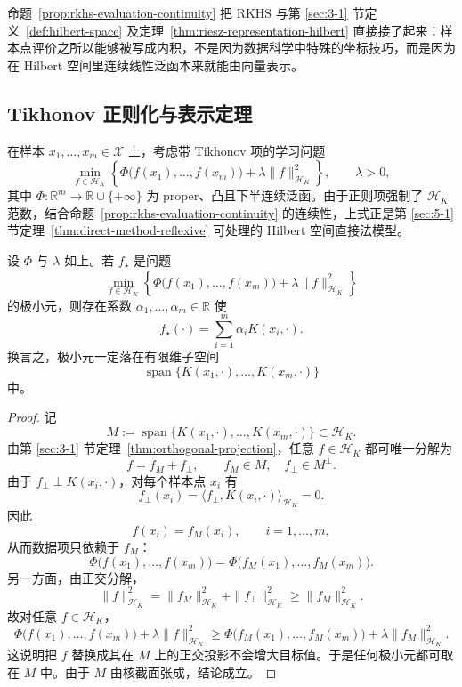 \begin{remark}
命题~\ref{prop:rkhs-evaluation-continuity} 把 RKHS 与第 \ref{sec:3-1} 节定义~\ref{def:hilbert-space} 及定理~\ref{thm:riesz-representation-hilbert} 直接接了起来：样本点评价之所以能够被写成内积，不是因为数据科学中特殊的坐标技巧，而是因为在 Hilbert 空间里连续线性泛函本来就能由向量表示。
\end{remark}

\subsection{Tikhonov 正则化与表示定理}

在样本 $x_1,\dots,x_m\in \mathcal X$ 上，考虑带 Tikhonov 项的学习问题
\[
\min_{f\in \mathcal H_K}
\left\{
\Phi\bigl(f(x_1),\dots,f(x_m)\bigr)+\lambda \|f\|_{\mathcal H_K}^2
\right\},
\qquad \lambda>0,
\]
其中 $\Phi\colon \mathbb R^m\to \mathbb R\cup\{+\infty\}$ 为 proper、凸且下半连续泛函。由于正则项强制了 $\mathcal H_K$ 范数，结合命题~\ref{prop:rkhs-evaluation-continuity} 的连续性，上式正是第 \ref{sec:5-1} 节定理~\ref{thm:direct-method-reflexive} 可处理的 Hilbert 空间直接法模型。

\begin{theorem}\label{thm:representer-theorem}
设 $\Phi$ 与 $\lambda$ 如上。若 $f_\star$ 是问题
\[
\min_{f\in \mathcal H_K}
\left\{
\Phi\bigl(f(x_1),\dots,f(x_m)\bigr)+\lambda \|f\|_{\mathcal H_K}^2
\right\}
\]
的极小元，则存在系数 $\alpha_1,\dots,\alpha_m\in \mathbb R$ 使
\[
f_\star(\cdot)=\sum_{i=1}^m \alpha_i K(x_i,\cdot).
\]
换言之，极小元一定落在有限维子空间
\[
\operatorname{span}\{K(x_1,\cdot),\dots,K(x_m,\cdot)\}
\]
中。
\end{theorem}

\begin{proof}
记
\[
M:=\operatorname{span}\{K(x_1,\cdot),\dots,K(x_m,\cdot)\}\subset \mathcal H_K.
\]
由第 \ref{sec:3-1} 节定理~\ref{thm:orthogonal-projection}，任意 $f\in \mathcal H_K$ 都可唯一分解为
\[
f=f_M+f_\perp,
\qquad
f_M\in M,\quad f_\perp\in M^\perp.
\]
由于 $f_\perp\perp K(x_i,\cdot)$，对每个样本点 $x_i$ 有
\[
f_\perp(x_i)=\langle f_\perp,K(x_i,\cdot)\rangle_{\mathcal H_K}=0.
\]
因此
\[
f(x_i)=f_M(x_i),\qquad i=1,\dots,m,
\]
从而数据项只依赖于 $f_M$：
\[
\Phi\bigl(f(x_1),\dots,f(x_m)\bigr)
=
\Phi\bigl(f_M(x_1),\dots,f_M(x_m)\bigr).
\]
另一方面，由正交分解，
\[
\|f\|_{\mathcal H_K}^2=\|f_M\|_{\mathcal H_K}^2+\|f_\perp\|_{\mathcal H_K}^2
\ge \|f_M\|_{\mathcal H_K}^2.
\]
故对任意 $f\in \mathcal H_K$，
\[
\Phi\bigl(f(x_1),\dots,f(x_m)\bigr)+\lambda \|f\|_{\mathcal H_K}^2
\ge
\Phi\bigl(f_M(x_1),\dots,f_M(x_m)\bigr)+\lambda \|f_M\|_{\mathcal H_K}^2.
\]
这说明把 $f$ 替换成其在 $M$ 上的正交投影不会增大目标值。于是任何极小元都可取在 $M$ 中。由于 $M$ 由核截面张成，结论成立。
\end{proof}

